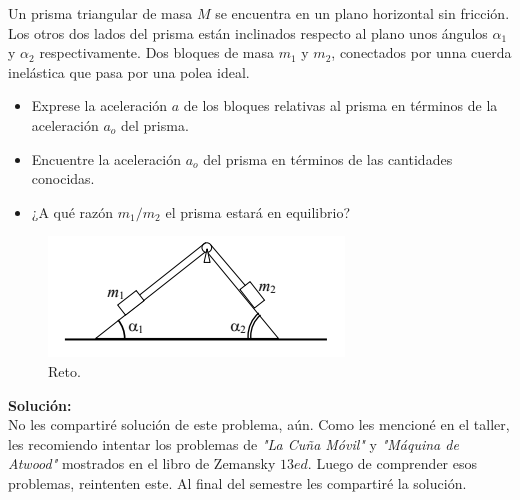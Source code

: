 \begin{mdframed}[style=warning]
	\begin{reto}
		Un prisma triangular de masa $M$ se encuentra en un plano horizontal sin fricción. Los otros dos lados del prisma están inclinados respecto al plano unos ángulos $\alpha _1$ y $\alpha _2$ respectivamente. Dos bloques de masa $m_1$ y $m_2$, conectados por unna cuerda inelástica que pasa por una polea ideal.
	\begin{itemize}
		\item Exprese la aceleración $a$ de los bloques relativas al prisma en términos de la aceleración $a_o$ del prisma.
		\item Encuentre la aceleración $a_o$ del prisma en términos de las cantidades conocidas.
		\item ¿A qué razón $m_1 /m_2$ el prisma estará en equilibrio?
	\end{itemize}
		\begin{figure}[H]
			\centering
			\includegraphics[scale=0.7]{./img/cunamovil.png}
			\caption{Reto.}
		\end{figure}
	\end{reto}
	\noindent \textbf{Solución: } \\
	No les compartiré solución de este problema, aún. Como les mencioné en el taller, les recomiendo intentar los problemas de \textit{"La Cuña Móvil"} y \textit{"Máquina de Atwood"} mostrados en el libro de Zemansky $13ed$. Luego de comprender esos problemas, reintenten este. Al final del semestre les compartiré la solución.
\end{mdframed}


















